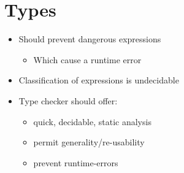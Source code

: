 
\section{Types}
\begin{itemize}
    \item Should prevent dangerous expressions
        \begin{itemize}
            \item Which cause a runtime error
        \end{itemize}
    \item Classification of expressions is undecidable
    \item Type checker should offer:
        \begin{itemize}
            \item quick, decidable, static analysis
            \item permit generality/re-usability
            \item prevent runtime-errors
        \end{itemize}
\end{itemize}

